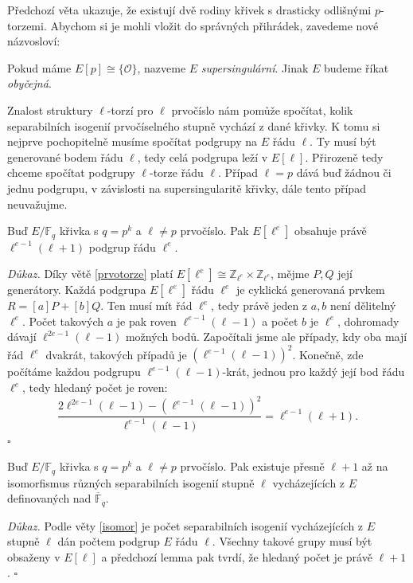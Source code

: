 \documentclass[12pt]{report}
\begin{document}
Předchozí věta ukazuje, že existují dvě rodiny křivek s drasticky odlišnými $p$-torzemi. Abychom si je mohli vložit do správných přihrádek, zavedeme nové názvosloví:

\begin{definice}
Pokud máme $E[p] \cong \lbrace \mathcal{O} \rbrace $, nazveme $E$ \textit{supersingulární}. Jinak $E$ budeme říkat \textit{obyčejná}.
\end{definice}

Znalost struktury $\ell$-torzí pro $\ell$ prvočíslo nám pomůže spočítat, kolik separabilních isogenií prvočíselného stupně vychází z dané křivky. K tomu si nejprve pochopitelně musíme spočítat podgrupy na $E$ řádu $\ell$. Ty musí být generované bodem řádu $\ell$, tedy celá podgrupa leží v $E[\ell]$. Přirozeně tedy chceme spočítat podgrupy $\ell$-torze řádu $\ell$. Případ $\ell = p$ dává buď žádnou či jednu podgrupu, v závislosti na supersingularitě křivky, dále tento případ neuvažujme.
\begin{lemma}\label{bigl+1}
Buď $E/\mathbb{F}_{q}$ křivka s $q = p^k$ a $\ell \neq p$ prvočíslo. Pak $E[\ell ^e]$ obsahuje právě $\ell^{e-1} (\ell+1)$ podgrup řádu $\ell^e$.
\end{lemma}
\noindent \textit{Důkaz.} Díky větě \ref{prvotorze} platí $E[\ell^e] \cong \mathbb{Z}_{\ell ^e} \times \mathbb{Z}_{\ell ^e}$, mějme $P,Q$ její generátory. Každá podgrupa $E[\ell ^e]$ řádu $\ell^e$ je cyklická generovaná prvkem $R = [a]P+[b]Q$. Ten musí mít řád $\ell^e$, tedy právě jeden z $a,b$ není dělitelný $\ell^e$. Počet takových $a$ je pak roven $\ell^{e-1} (\ell -1)$ a počet $b$ je $\ell^e$, dohromady dávají $\ell^{2e-1} (\ell -1)$ možných bodů. Započítali jsme ale případy, kdy oba mají řád $\ell^e$ dvakrát, takových případů je $(\ell^{e-1} (\ell - 1))^2$. Konečně, zde počítáme každou podgrupu $\ell^{e-1}(\ell-1)$-krát, jednou pro každý její bod řádu $\ell^e$, tedy hledaný počet je roven:
\begin{equation*}
\frac{2 \ell^{2e-1} (\ell - 1) - (\ell^{e-1} (\ell - 1))^2}{\ell^{e-1}(\ell-1)} = \ell^{e-1} (\ell+1).
\end{equation*}
 \hfill $\square$\\

\begin{dusledek}\label{l+1}
Buď $E/\mathbb{F}_{q}$ křivka s $q = p^k$ a $\ell \neq p$ prvočíslo. Pak existuje přesně $\ell+1$ až na isomorfismus různých separabilních isogenií stupně $\ell$ vycházejících z $E$ definovaných nad $\overline{\mathbb{F}}_{q}$.
\end{dusledek}
\noindent \textit{Důkaz.} Podle věty \ref{isomor} je počet separabilních isogenií vycházejících z $E$ stupně $\ell$ dán počtem podgrup $E$ řádu $\ell$. Všechny takové grupy musí být obsaženy v $E[\ell]$ a předchozí lemma pak tvrdí, že hledaný počet je právě $\ell+1$. \hfill $\square$\\
\end{document}
